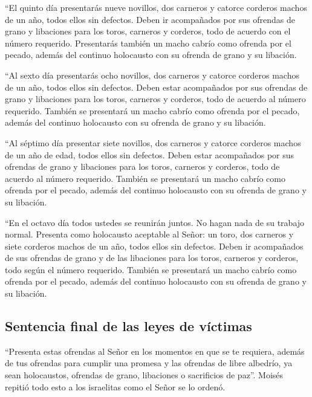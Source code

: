  ``El quinto día presentarás nueve novillos, dos carneros
y catorce corderos machos de un año, todos ellos sin defectos.
 Deben ir acompañados por sus ofrendas de grano y
libaciones para los toros, carneros y corderos, todo de acuerdo con el
número requerido.  Presentarás también un macho cabrío
como ofrenda por el pecado, además del continuo holocausto con su
ofrenda de grano y su libación.

 ``Al sexto día presentarás ocho novillos, dos carneros y
catorce corderos machos de un año, todos ellos sin defectos.
 Deben estar acompañados por sus ofrendas de grano y
libaciones para los toros, carneros y corderos, todo de acuerdo al
número requerido.  También se presentará un macho cabrío
como ofrenda por el pecado, además del continuo holocausto con su
ofrenda de grano y su libación.

 ``Al séptimo día presentar siete novillos, dos carneros
y catorce corderos machos de un año de edad, todos ellos sin defectos.
 Deben estar acompañados por sus ofrendas de grano y
libaciones para los toros, carneros y corderos, todo de acuerdo al
número requerido.  También se presentará un macho cabrío
como ofrenda por el pecado, además del continuo holocausto con su
ofrenda de grano y su libación.

 ``En el octavo día todos ustedes se reunirán juntos. No
hagan nada de su trabajo normal.  Presenta como
holocausto aceptable al Señor: un toro, dos carneros y siete corderos
machos de un año, todos ellos sin defectos.  Deben ir
acompañados de sus ofrendas de grano y de las libaciones para los toros,
carneros y corderos, todo según el número requerido. 
También se presentará un macho cabrío como ofrenda por el pecado, además
del continuo holocausto con su ofrenda de grano y su libación.

\hypertarget{sentencia-final-de-las-leyes-de-vuxedctimas}{%
\subsection{Sentencia final de las leyes de
víctimas}\label{sentencia-final-de-las-leyes-de-vuxedctimas}}

 ``Presenta estas ofrendas al Señor en los momentos en
que se te requiera, además de tus ofrendas para cumplir una promesa y
las ofrendas de libre albedrío, ya sean holocaustos, ofrendas de grano,
libaciones o sacrificios de paz''.  Moisés repitió todo
esto a los israelitas como el Señor se lo ordenó.

